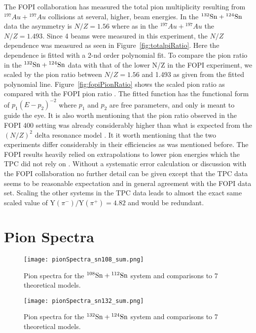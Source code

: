 The FOPI collaboration has measured the total pion multiplicity resulting from ${}^{197}Au + {}^{197}Au$ collisions at several, higher, beam energies. In the ${}^{132}\mathrm{Sn} + {}^{124}\mathrm{Sn}$ data the asymmetry is $N/Z=1.56$ where as in the ${}^{197}Au + {}^{197}Au$ the $N/Z=1.493$. Since 4 beams were measured in this experiment, the $N/Z$ dependence was measured as seen in Figure~\ref{fig:totalpiRatio}. Here the dependence is fitted with a 2-nd order polynomial fit. To compare the pion ratio in the ${}^{132}\mathrm{Sn} + {}^{124}\mathrm{Sn}$ data with that of the lower N/Z in the FOPI experiment, we scaled by the pion ratio between $N/Z=1.56$ and 1.493 as given from the fitted polynomial line. Figure~\ref{fig:fopiPionRatio} shows the scaled pion ratio as compared with the FOPI pion ratio \cite{fopi}. The fitted function has the functional form of $p_1(E - p_2)^{-2}$ where $p_1$ and $p_2$ are free parameters, and only is meant to guide the eye. It is also worth mentioning that the pion ratio observed in the FOPI \SI{400}{\MeVA} setting was already considerably higher than what is expected from the $(N/Z)^2$ delta resonance model \cite{baoan_piprod1,baoan_piprod2}. It it worth mentioning that the two experiments differ considerably in their efficiencies as was mentioned before. The FOPI results heavily relied on extrapolations to lower pion energies which the \spirit TPC did not rely on \cite{fopi}. Without a systematic error calculation or discussion with the FOPI collaboration no further detail can be given except that the \spirit TPC data seems to be reasonable expectation and in general agreement with the FOPI data set. Scaling the other systems in the \spirit TPC data leads to almost the exact same scaled value of $\mathrm{Y}(\pi^-)/\mathrm{Y}(\pi^+) = \num{4.82}$ and would be redundant. 




\section{Pion Spectra}
\label{sec:pionSpectra}


\begin{figure}[!htb]
\centering
\texttt{[image: pionSpectra\_sn108\_sum.png]}
\caption{Pion spectra for the ${}^{108}\mathrm{Sn} + {}^{112}\mathrm{Sn}$ system and comparisons to 7 theoretical models. }
\label{fig:pionspectraSn108}
\end{figure}


\begin{figure}[!htb]
\centering
\texttt{[image: pionSpectra\_sn132\_sum.png]}
\caption{Pion spectra for the ${}^{132}\mathrm{Sn} + {}^{124}\mathrm{Sn}$ system and comparisons to 7 theoretical models. }
\label{fig:pionspectraSn132}
\end{figure}


